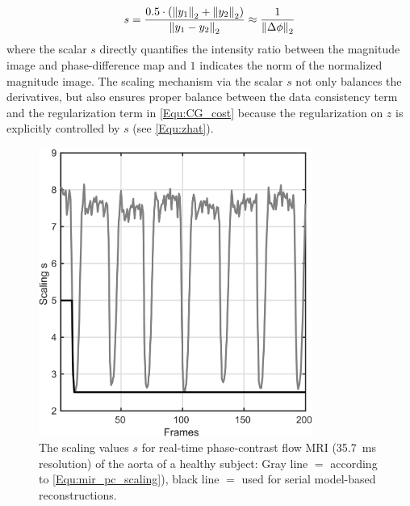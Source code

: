 \begin{equation} \label{Equ:mir_pc_scaling}
  s = \frac{0.5 \cdot (\left\lVert y_1\right\rVert_2 + \left\lVert y_2\right\rVert_2)}{\left\lVert y_1 - y_2\right\rVert_2} \approx \frac{1}{\left\lVert\Delta \phi\right\rVert_2} 
\end{equation}
where the scalar $s$ directly quantifies the intensity ratio between the magnitude image and phase-difference map and $1$ indicates the norm of the normalized magnitude image. The scaling mechanism via the scalar $s$ not only balances the derivatives, but also ensures proper balance between the data consistency term and the regularization term in \cref{Equ:CG_cost} because the regularization on $z$ is explicitly controlled by $s$ (see \cref{Equ:zhat}).

\begin{figure}[tb]
  \centering
  \includegraphics[width=0.8\textwidth]{fig/mir-pc-scaling.png}
  \caption{The scaling values $s$ for real-time phase-contrast flow MRI (\SI{35.7}{\ms} resolution) of the aorta of a healthy subject: Gray line $=$ according to \cref{Equ:mir_pc_scaling}), black line $=$ used for serial model-based reconstructions.} \label{Fig:mir-pc-scaling}
\end{figure}

